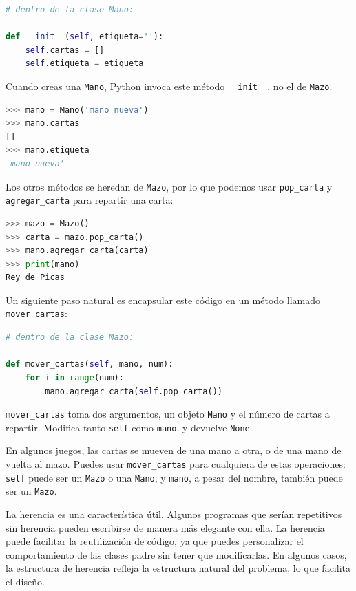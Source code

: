\begin{lstlisting}[language=Python]
# dentro de la clase Mano:

def __init__(self, etiqueta=''):
    self.cartas = []
    self.etiqueta = etiqueta
\end{lstlisting}

Cuando creas una \texttt{Mano}, Python invoca este método \texttt{\_\_init\_\_}, no el de \texttt{Mazo}.

\begin{lstlisting}[language=Python]
>>> mano = Mano('mano nueva')
>>> mano.cartas
[]
>>> mano.etiqueta
'mano nueva'
\end{lstlisting}

Los otros métodos se heredan de \texttt{Mazo}, por lo que podemos usar \texttt{pop\_carta} y \texttt{agregar\_carta} para repartir una carta:

\begin{lstlisting}[language=Python]
>>> mazo = Mazo()
>>> carta = mazo.pop_carta()
>>> mano.agregar_carta(carta)
>>> print(mano)
Rey de Picas
\end{lstlisting}


Un siguiente paso natural es encapsular este código en un método llamado \texttt{mover\_cartas}:

\begin{lstlisting}[language=Python]
# dentro de la clase Mazo:

def mover_cartas(self, mano, num):
    for i in range(num):
        mano.agregar_carta(self.pop_carta())
\end{lstlisting}

\texttt{mover\_cartas} toma dos argumentos, un objeto \texttt{Mano} y el número de cartas a repartir. Modifica tanto \texttt{self} como \texttt{mano}, y devuelve \texttt{None}.

En algunos juegos, las cartas se mueven de una mano a otra, o de una mano de vuelta al mazo. Puedes usar \texttt{mover\_cartas} para cualquiera de estas operaciones: \texttt{self} puede ser un \texttt{Mazo} o una \texttt{Mano}, y \texttt{mano}, a pesar del nombre, también puede ser un \texttt{Mazo}.

La herencia es una característica útil. Algunos programas que serían repetitivos sin herencia pueden escribirse de manera más elegante con ella. La herencia puede facilitar la reutilización de código, ya que puedes personalizar el comportamiento de las clases padre sin tener que modificarlas. En algunos casos, la estructura de herencia refleja la estructura natural del problema, lo que facilita el diseño.

